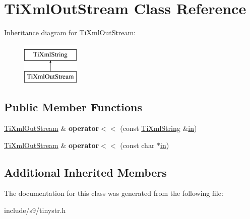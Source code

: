 \hypertarget{classTiXmlOutStream}{\section{Ti\-Xml\-Out\-Stream Class Reference}
\label{classTiXmlOutStream}
}
Inheritance diagram for Ti\-Xml\-Out\-Stream\-:\begin{figure}[H]
\begin{center}
\leavevmode
\includegraphics[height=2.000000cm]{classTiXmlOutStream}
\end{center}
\end{figure}
\subsection*{Public Member Functions}
\begin{DoxyCompactItemize}
\item 
\hypertarget{classTiXmlOutStream_a3640dcb1c0903be3bc6966cdc9a79db6}{\hyperlink{classTiXmlOutStream}{Ti\-Xml\-Out\-Stream} \& {\bfseries operator$<$$<$} (const \hyperlink{classTiXmlString}{Ti\-Xml\-String} \&\hyperlink{structin}{in})}\label{classTiXmlOutStream_a3640dcb1c0903be3bc6966cdc9a79db6}

\item 
\hypertarget{classTiXmlOutStream_af2117e5a8cbfcb69544804ad2859bfb6}{\hyperlink{classTiXmlOutStream}{Ti\-Xml\-Out\-Stream} \& {\bfseries operator$<$$<$} (const char $\ast$\hyperlink{structin}{in})}\label{classTiXmlOutStream_af2117e5a8cbfcb69544804ad2859bfb6}

\end{DoxyCompactItemize}
\subsection*{Additional Inherited Members}


The documentation for this class was generated from the following file\-:\begin{DoxyCompactItemize}
\item 
include/s9/tinystr.\-h\end{DoxyCompactItemize}
